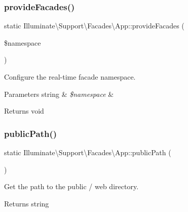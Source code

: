 \subsubsection{\texorpdfstring{provide\+Facades()}{provideFacades()}}
{\footnotesize\ttfamily static Illuminate\textbackslash{}\+Support\textbackslash{}\+Facades\textbackslash{}\+App\+::provide\+Facades (\begin{DoxyParamCaption}\item[{}]{\$namespace }\end{DoxyParamCaption})\hspace{0.3cm}{\ttfamily [static]}}

Configure the real-\/time facade namespace.


\begin{DoxyParams}[1]{Parameters}
string & {\em \$namespace} & \\
\hline
\end{DoxyParams}
\begin{DoxyReturn}{Returns}
void 
\end{DoxyReturn}
\mbox{\label{class_illuminate_1_1_support_1_1_facades_1_1_app_addeef28bcdf95f970e3a60d009d3d6c3}} 
\subsubsection{\texorpdfstring{public\+Path()}{publicPath()}}
{\footnotesize\ttfamily static Illuminate\textbackslash{}\+Support\textbackslash{}\+Facades\textbackslash{}\+App\+::public\+Path (\begin{DoxyParamCaption}{ }\end{DoxyParamCaption})\hspace{0.3cm}{\ttfamily [static]}}

Get the path to the public / web directory.

\begin{DoxyReturn}{Returns}
string 
\end{DoxyReturn}
\mbox{\label{class_illuminate_1_1_support_1_1_facades_1_1_app_a339861dbb69a8272f82ea394089c98c1}} 
